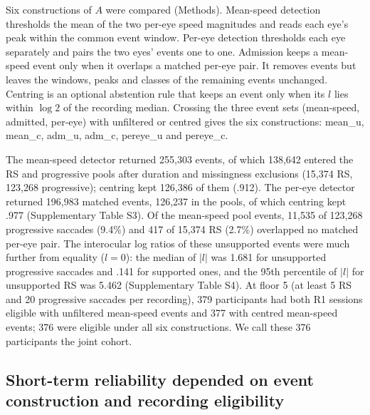 

Six constructions of $A$ were compared (Methods). Mean-speed detection thresholds the mean of the two per-eye speed magnitudes and reads each eye's peak within the common event window. Per-eye detection thresholds each eye separately and pairs the two eyes' events one to one. Admission keeps a mean-speed event only when it overlaps a matched per-eye pair. It removes events but leaves the windows, peaks and classes of the remaining events unchanged. Centring is an optional abstention rule that keeps an event only when its $l$ lies within $\log 2$ of the recording median. Crossing the three event sets (mean-speed, admitted, per-eye) with unfiltered or centred gives the six constructions: mean\_u, mean\_c, adm\_u, adm\_c, pereye\_u and pereye\_c.

The mean-speed detector returned 255,303 events, of which 138,642 entered the RS and progressive pools after duration and missingness exclusions (15,374 RS, 123,268 progressive); centring kept 126,386 of them (.912). The per-eye detector returned 196,983 matched events, 126,237 in the pools, of which centring kept .977 (Supplementary Table S3). Of the mean-speed pool events, 11,535 of 123,268 progressive saccades (9.4\%) and 417 of 15,374 RS (2.7\%) overlapped no matched per-eye pair. The interocular log ratios of these unsupported events were much further from equality ($l = 0$): the median of $|l|$ was 1.681 for unsupported progressive saccades and .141 for supported ones, and the 95th percentile of $|l|$ for unsupported RS was 5.462 (Supplementary Table S4). At floor 5 (at least 5 RS and 20 progressive saccades per recording), 379 participants had both R1 sessions eligible with unfiltered mean-speed events and 377 with centred mean-speed events; 376 were eligible under all six constructions. We call these 376 participants the joint cohort.

\subsection{Short-term reliability depended on event construction and recording eligibility}

